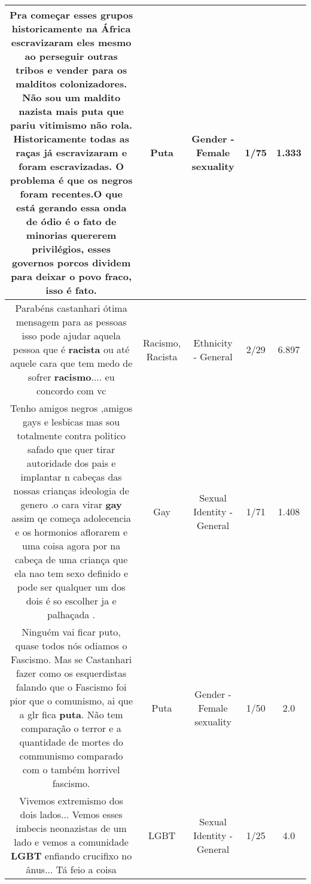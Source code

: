 \documentclass[11pt]{article}
\newlength\mylength
\begin{document}
\begin{center}
\begin{longtable}{|C{.65\mylength}|C{.30\mylength}|C{.12\mylength}|C{.12\mylength}|C{.12\mylength}|}
  \small Pra começar esses grupos historicamente na África escravizaram eles mesmo ao perseguir outras tribos e vender para os malditos colonizadores. Não sou um maldito nazista mais \textbf{puta} que pariu vitimismo não rola. Historicamente todas as raças já escravizaram e foram escravizadas. O problema é que os negros foram recentes.O que está gerando essa onda de ódio é o fato de minorias quererem privilégios, esses governos porcos dividem para deixar o povo fraco, isso é fato.\normalsize   & Puta & Gender - Female sexuality & 1/75 & 1.333 \\  \hline
  \small Parabéns castanhari ótima mensagem para as pessoas isso pode ajudar aquela pessoa que é \textbf{racista} ou até aquele cara que tem medo de sofrer \textbf{racismo}.... eu concordo com vc\normalsize   & Racismo, Racista & Ethnicity - General & 2/29 & 6.897 \\  \hline
  \small Tenho amigos negros ,amigos gays e lesbicas mas sou totalmente contra politico safado que quer tirar autoridade dos pais e implantar n cabeças das nossas crianças ideologia de genero .o cara virar \textbf{gay} assim qe começa adolecencia e os hormonios   aflorarem e uma coisa agora por na cabeça de uma criança que ela nao tem sexo definido e pode ser qualquer um dos dois é so escolher ja e palhaçada .\normalsize   & Gay & Sexual Identity - General & 1/71 & 1.408 \\  \hline
  \small Ninguém vai ficar puto, quase todos nós odiamos o Fascismo. Mas se Castanhari fazer como os esquerdistas falando que o Fascismo foi pior que o comunismo, ai que a glr fica \textbf{puta}. Não tem comparação o terror e a quantidade de mortes do communismo comparado com o também horrivel fascismo.\normalsize   & Puta & Gender - Female sexuality & 1/50 & 2.0 \\  \hline
  \small Vivemos extremismo dos dois lados... Vemos esses imbecis neonazistas de um lado e vemos a comunidade \textbf{LGBT} enfiando crucifixo no ânus... Tá feio a coisa\normalsize   & LGBT & Sexual Identity - General & 1/25 & 4.0 \\  \hline

\end{longtable}
\end{center}
\end{document}
